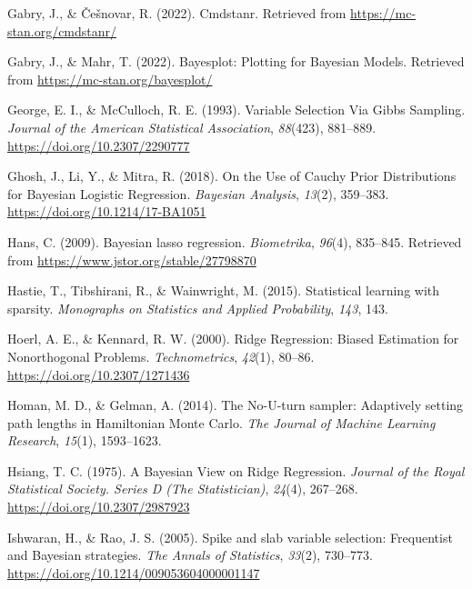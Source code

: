 \documentclass[
  man, donotrepeattitle,floatsintext]{apa6}
\newlength{\cslhangindent}
\newlength{\cslentryspacingunit} %
\newenvironment{CSLReferences}[2] %
 {%
  \setlength{\parindent}{0pt}
  \ifodd #1
  \let\oldpar\par
  \def\par{\hangindent=\cslhangindent\oldpar}
  \fi
  \setlength{\parskip}{#2\cslentryspacingunit}
 }%
 {}
\begin{document}
\begin{CSLReferences}{1}{0}
\leavevmode{}%
Gabry, J., \& Češnovar, R. (2022). Cmdstanr. Retrieved from \url{https://mc-stan.org/cmdstanr/}

\leavevmode{}%
Gabry, J., \& Mahr, T. (2022). Bayesplot: {Plotting} for {Bayesian} {Models}. Retrieved from \url{https://mc-stan.org/bayesplot/}

\leavevmode{}%
George, E. I., \& McCulloch, R. E. (1993). Variable {Selection} {Via} {Gibbs} {Sampling}. \emph{Journal of the American Statistical Association}, \emph{88}(423), 881--889. \url{https://doi.org/10.2307/2290777}

\leavevmode{}%
Ghosh, J., Li, Y., \& Mitra, R. (2018). On the {Use} of {Cauchy} {Prior} {Distributions} for {Bayesian} {Logistic} {Regression}. \emph{Bayesian Analysis}, \emph{13}(2), 359--383. \url{https://doi.org/10.1214/17-BA1051}

\leavevmode{}%
Hans, C. (2009). Bayesian lasso regression. \emph{Biometrika}, \emph{96}(4), 835--845. Retrieved from \url{https://www.jstor.org/stable/27798870}

\leavevmode{}%
Hastie, T., Tibshirani, R., \& Wainwright, M. (2015). Statistical learning with sparsity. \emph{Monographs on Statistics and Applied Probability}, \emph{143}, 143.

\leavevmode{}%
Hoerl, A. E., \& Kennard, R. W. (2000). Ridge {Regression}: {Biased} {Estimation} for {Nonorthogonal} {Problems}. \emph{Technometrics}, \emph{42}(1), 80--86. \url{https://doi.org/10.2307/1271436}

\leavevmode{}%
Homan, M. D., \& Gelman, A. (2014). The {No}-{U}-turn sampler: Adaptively setting path lengths in {Hamiltonian} {Monte} {Carlo}. \emph{The Journal of Machine Learning Research}, \emph{15}(1), 1593--1623.

\leavevmode{}%
Hsiang, T. C. (1975). A {Bayesian} {View} on {Ridge} {Regression}. \emph{Journal of the Royal Statistical Society. Series D (The Statistician)}, \emph{24}(4), 267--268. \url{https://doi.org/10.2307/2987923}

\leavevmode{}%
Ishwaran, H., \& Rao, J. S. (2005). Spike and slab variable selection: {Frequentist} and {Bayesian} strategies. \emph{The Annals of Statistics}, \emph{33}(2), 730--773. \url{https://doi.org/10.1214/009053604000001147}


\end{CSLReferences}
\end{document}
